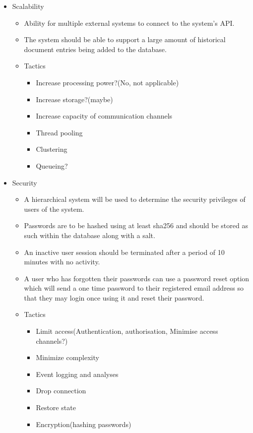 \documentclass[a4paper,12pt]{article}
\begin{document}
\begin{itemize}
\begin{itemize}
		\end{itemize}
		\item Scalability
		\begin{itemize}
			\item Ability for multiple external systems to connect to the system's API.
			\item The system should be able to support a large amount of historical document entries being added to the database.
			
			\item Tactics
			\begin{itemize}
				\item Increase processing power?(No, not applicable)
				\item Increase storage?(maybe) 
				\item Increase capacity of communication channels
				\item Thread pooling
				\item Clustering
				\item Queueing?
			\end{itemize}
						
		\end{itemize}
		\item Security
		\begin{itemize}
			\item A hierarchical system will be used to determine the security privileges of users of the system.
			\item Passwords are to be hashed using at least sha256 and should be stored as such within the database along with a salt.
			\item An inactive user session should be terminated after a period of 10 minutes with no activity.
			\item A user who has forgotten their passwords can use a password reset option which will send a one time password to their registered email address so that they may login once using it and reset their password.
			
			\item Tactics
			\begin{itemize}
				\item Limit access(Authentication, authorisation, Minimise access channels?)
				\item Minimize complexity
				\item Event logging and analyses
				\item Drop connection
				\item Restore state
				\item Encryption(hashing passwords)
				

\end{itemize}
\end{itemize}
\end{itemize}
\end{document}
